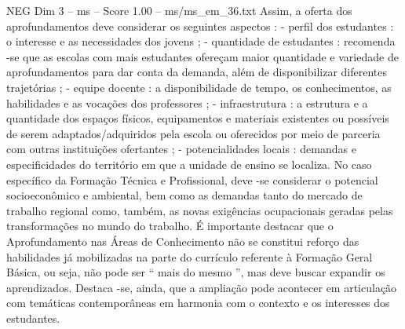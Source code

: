 \begin{textsample}{NEG Dim 3 – ms – Score 1.00 – ms/ms\_em\_36.txt}
Assim, a oferta dos aprofundamentos deve considerar os seguintes aspectos : - perfil dos estudantes : o interesse e as necessidades dos jovens ; - quantidade de estudantes : recomenda -se que as escolas com mais estudantes ofereçam maior quantidade e variedade de aprofundamentos para dar conta da demanda, além de disponibilizar diferentes trajetórias ; - equipe docente : a disponibilidade de tempo, os conhecimentos, as habilidades e as vocações dos professores ; - infraestrutura : a estrutura e a quantidade dos espaços físicos, equipamentos e materiais existentes ou possíveis de serem adaptados/adquiridos pela escola ou oferecidos por meio de parceria com outras instituições ofertantes ; - potencialidades locais : demandas e especificidades do território em que a unidade de ensino se localiza.
No caso específico da Formação Técnica e Profissional, deve -se considerar o potencial socioeconômico e ambiental, bem como as demandas tanto do mercado de trabalho regional como, também, as novas exigências ocupacionais geradas pelas transformações no mundo do trabalho.
É importante destacar que o Aprofundamento nas Áreas de Conhecimento não se constitui reforço das habilidades já mobilizadas na parte do currículo referente à Formação Geral Básica, ou seja, não pode ser “ mais do mesmo ”, mas deve buscar expandir os aprendizados.
Destaca -se, ainda, que a ampliação pode acontecer em articulação com temáticas contemporâneas em harmonia com o contexto e os interesses dos estudantes.

\end{textsample}

